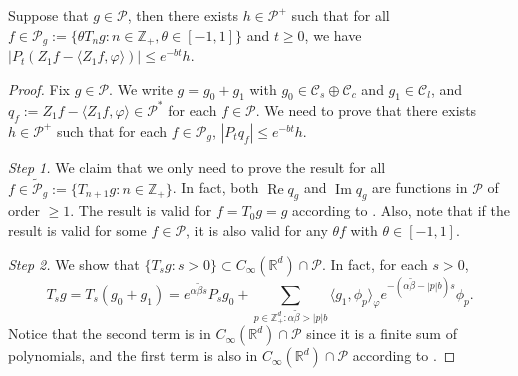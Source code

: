 \documentclass[a4paper,12pt, reqno]{amsart}
\numberwithin{equation}{section}
\begin{document}
\begin{lem}
	\label{lem:P:R}
	Suppose that $g \in \mathcal P$, then there exists $h \in \mathcal P^+$ such that for all $ f \in \mathcal P_g := \{\theta T_n g: n \in \mathbb Z_+, \theta \in [-1,1]\} $ and $t\geq 0$, we have $ | P_t (Z_1 f - \langle Z_1 f, \varphi \rangle )| \leq e^{-bt} h$.
\end{lem}
\begin{proof}
	Fix $g \in \mathcal P$.
	We write  $g = g_0 + g_1$ with $g_0 \in \mathcal C_s \oplus \mathcal C_c$ and $g_1 \in \mathcal C_l$,  and $q_f:=Z_1f - \langle Z_1f, \varphi \rangle\in \mathcal P^*$ for each $f\in \mathcal P$.
	We need to prove that there exists $h \in \mathcal P^+$ such that for each $f\in \mathcal P_g$, $|P_tq_f| \leq e^{-bt} h$.
	
	\emph{Step 1.} We claim  that we only need to prove the result for all
	$f \in \widetilde{\mathcal P}_g:= \{T_{n+1} g : n \in \mathbb Z_+\}$.
	In fact, both $\operatorname{Re} q_g$ and $\operatorname{Im} q_g$ are functions in $\mathcal P$ of order $\geq 1$.
	The result is valid for $f = T_0 g = g$ according to \cite[Fact 1.2]{MarksMilos2018CLT}.
	Also, note that if the result is valid for some $f \in \mathcal P$, it is also valid for any $\theta f$ with $\theta \in [-1,1]$.
	
	
	\emph{Step 2.} We show that $\{T_s g: s> 0\} \subset C_\infty (\mathbb R^d) \cap \mathcal P$.
	In fact, for each $s > 0$,
	\[
	T_s g
	= T_s (g_0 + g_1)
	= e^{\alpha \tilde \beta s}P_s g_0 + \sum_{p \in \mathbb Z_+^d: \alpha \tilde \beta > |p|b} 
	\langle g_1, \phi_p \rangle_\varphi e^{-(\alpha \tilde \beta - |p|b)s} \phi_p.
	\]
	Notice that the second term is in $C_\infty(\mathbb R^d)\cap \mathcal P$ since it is a finite sum of polynomials, and the first term is also in $C_\infty (\mathbb R^d) \cap \mathcal P$ according to \cite[Fact 1.1]{MarksMilos2018CLT}.
	

\end{proof}
\end{document}

